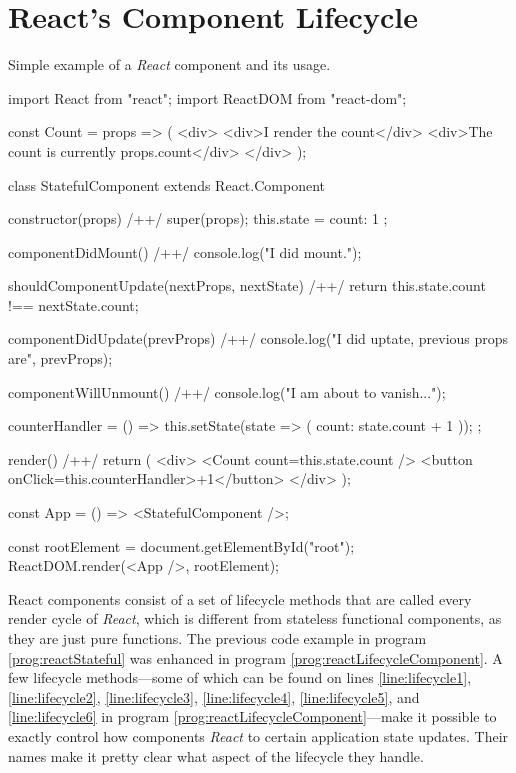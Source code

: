 
\section{React's Component Lifecycle}

\begin{program}
\caption{Simple example of a \emph{React} component and its usage.} 
\label{prog:reactLifecycleComponent}
\begin{JsCode}
import React from "react";
import ReactDOM from "react-dom";

const Count = props => (
  <div>
    <div>I render the count</div>
    <div>The count is currently {props.count}</div>
  </div>
);

class StatefulComponent extends React.Component {
  constructor(props) { /+\label{line:lifecycle1}+/
    super(props);
    this.state = {
      count: 1
    };
  }

  componentDidMount() { /+\label{line:lifecycle2}+/
    console.log("I did mount.");
  }

  shouldComponentUpdate(nextProps, nextState) { /+\label{line:lifecycle3}+/
    return this.state.count !== nextState.count;
  }

  componentDidUpdate(prevProps) { /+\label{line:lifecycle4}+/
    console.log("I did uptate, previous props are", prevProps);
  }

  componentWillUnmount() { /+\label{line:lifecycle5}+/
    console.log("I am about to vanish...");
  }

  counterHandler = () => {
    this.setState(state => ({ count: state.count + 1 }));
  };

  render() { /+\label{line:lifecycle6}+/
    return (
      <div>
        <Count count={this.state.count} />
        <button onClick={this.counterHandler}>+1</button>
      </div>
    );
  }
}
  
const App = () => <StatefulComponent />;

const rootElement = document.getElementById("root");
ReactDOM.render(<App />, rootElement);  
\end{JsCode}
\end{program}

React components consist of a set of lifecycle methods that are called every render cycle of \emph{React}, which is different from stateless functional components, as they are just pure functions. The previous code example in program \ref{prog:reactStateful} was enhanced in program \ref{prog:reactLifecycleComponent}. A few lifecycle methods---some of which can be found on lines \ref{line:lifecycle1}, \ref{line:lifecycle2}, \ref{line:lifecycle3}, \ref{line:lifecycle4}, \ref{line:lifecycle5}, and \ref{line:lifecycle6} in program \ref{prog:reactLifecycleComponent}---make it possible to exactly control how components \emph{React} to certain application state updates. Their names make it pretty clear what aspect of the lifecycle they handle.

